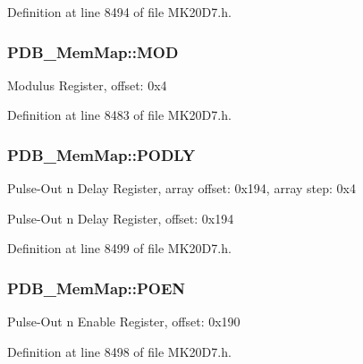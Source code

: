 Definition at line 8494 of file M\+K20\+D7.\+h.

\subsubsection[{\texorpdfstring{M\+OD}{MOD}}]{ P\+D\+B\+\_\+\+Mem\+Map\+::\+M\+OD}\hypertarget{struct_p_d_b___mem_map_a01bd648b1caa9b6626636fce386b496d}{}\label{struct_p_d_b___mem_map_a01bd648b1caa9b6626636fce386b496d}
Modulus Register, offset\+: 0x4 

Definition at line 8483 of file M\+K20\+D7.\+h.

\subsubsection[{\texorpdfstring{P\+O\+D\+LY}{PODLY}}]{ P\+D\+B\+\_\+\+Mem\+Map\+::\+P\+O\+D\+LY}\hypertarget{struct_p_d_b___mem_map_ad5478db890f719813bdd52f81386b737}{}\label{struct_p_d_b___mem_map_ad5478db890f719813bdd52f81386b737}
Pulse-\/\+Out n Delay Register, array offset\+: 0x194, array step\+: 0x4

Pulse-\/\+Out n Delay Register, offset\+: 0x194 

Definition at line 8499 of file M\+K20\+D7.\+h.

\subsubsection[{\texorpdfstring{P\+O\+EN}{POEN}}]{ P\+D\+B\+\_\+\+Mem\+Map\+::\+P\+O\+EN}\hypertarget{struct_p_d_b___mem_map_a259dc7b16cc8f12022cb6a5befb1660c}{}\label{struct_p_d_b___mem_map_a259dc7b16cc8f12022cb6a5befb1660c}
Pulse-\/\+Out n Enable Register, offset\+: 0x190 

Definition at line 8498 of file M\+K20\+D7.\+h.

